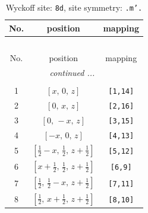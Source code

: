 \documentclass[fleqn,8pt]{jsarticle}
\begin{document}
\begin{longtable}{ccc}
\caption{Wyckoff site: {\tt 8d}, site symmetry: {\tt .m'.}}
 \\
 \hline \hline
No. & position & mapping \\ \hline \endfirsthead

\multicolumn{2}{l}{\tablename\ \thetable{}} \\
 \hline \hline
No. & position & mapping \\ \hline \endhead

 \hline \hline
\multicolumn{2}{r}{\footnotesize\it continued ...} \\ \endfoot

 \hline \hline
\multicolumn{2}{r}{} \\ \endlastfoot

1 & $\left[ x,\, 0,\, z \right]$ & {\tt [1,14]} \\ \hline
2 & $\left[ 0,\, x,\, z \right]$ & {\tt [2,16]} \\ \hline
3 & $\left[ 0,\, - x,\, z \right]$ & {\tt [3,15]} \\ \hline
4 & $\left[ - x,\, 0,\, z \right]$ & {\tt [4,13]} \\ \hline
5 & $\left[ \frac{1}{2} - x,\, \frac{1}{2},\, z + \frac{1}{2} \right]$ & {\tt [5,12]} \\ \hline
6 & $\left[ x + \frac{1}{2},\, \frac{1}{2},\, z + \frac{1}{2} \right]$ & {\tt [6,9]} \\ \hline
7 & $\left[ \frac{1}{2},\, \frac{1}{2} - x,\, z + \frac{1}{2} \right]$ & {\tt [7,11]} \\ \hline
8 & $\left[ \frac{1}{2},\, x + \frac{1}{2},\, z + \frac{1}{2} \right]$ & {\tt [8,10]} \\
\end{longtable}
\renewcommand{\arraystretch}{1.2}
\end{document}
